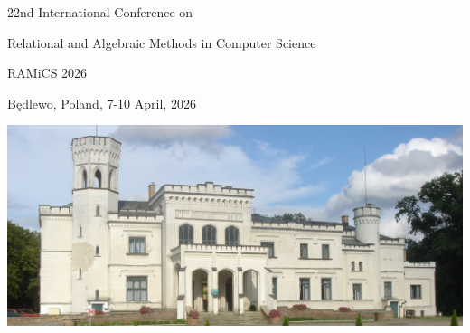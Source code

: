 \documentclass[a3paper, 12pt]{article}
\begin{document}
\begin{center}
  {\Huge 22nd International Conference on}

  \medskip

  {\Huge Relational and Algebraic Methods in Computer Science}

  \bigskip

  {\fontsize{36}{50}\selectfont RAMiCS 2026}

  \bigskip

  {\Huge Będlewo, Poland, 7-10 April, 2026}

  \bigskip

  \includegraphics[width=.65\linewidth]{figs/bedlewo-c}

  \medskip
\end{center}
\end{document}
